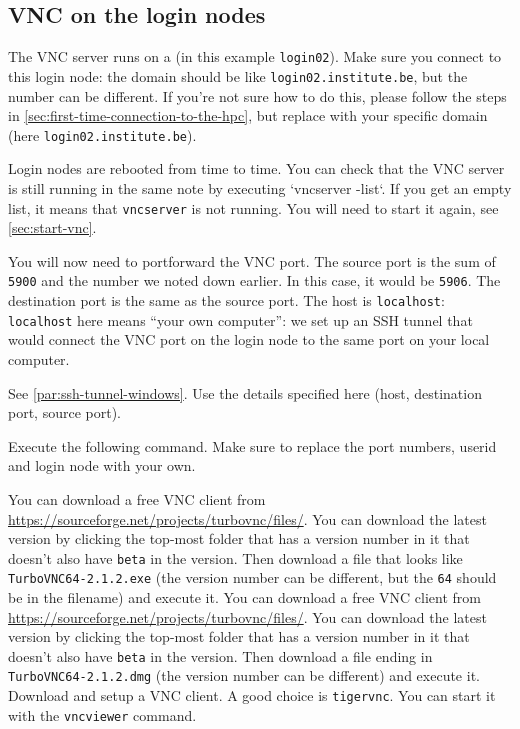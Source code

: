 \subsection{VNC on the login nodes}

The VNC server runs on a  (in this example \lstinline|login02|).
Make sure you connect to this login node: the domain should be like \lstinline|login02.institute.be|,
but the number can be different. If you're not sure how to do this, please follow the steps
in \autoref{sec:first-time-connection-to-the-hpc}, but replace \loginnode with your specific
domain (here \lstinline|login02.institute.be|).

Login nodes are rebooted from time to time. You can check that the VNC server is still
running in the same note by executing `vncserver -list`. If you get an empty list,
it means that \lstinline|vncserver| is not running. You will need to start it again,
see \autoref{sec:start-vnc}.

You will now need to portforward the VNC port. The source port is the sum of \lstinline|5900|
and the number we noted down earlier. In this case, it would be \lstinline|5906|.
The destination port is the same as the source port. The host is \lstinline|localhost|:
\lstinline|localhost| here means ``your own computer'': we set up an SSH tunnel that would
connect the VNC port on the login node to the same port on your local computer.

\ifwindows
See \autoref{par:ssh-tunnel-windows}. Use the details specified here (host, destination port,
source port).
\else

Execute the following command. Make sure to replace the port numbers, userid and login node
with your own.

\begin{prompt}
\end{prompt}
\fi

\ifwindows

You can download a free VNC client from \url{https://sourceforge.net/projects/turbovnc/files/}.
You can download the latest version by clicking the top-most folder that has a version number
in it that doesn't also have \lstinline|beta| in the version. Then download a file that looks like
\lstinline|TurboVNC64-2.1.2.exe| (the version number can be different, but the \lstinline|64|
should be in the filename) and execute it.
\fi
\ifmac
You can download a free VNC client from \url{https://sourceforge.net/projects/turbovnc/files/}.
You can download the latest version by clicking the top-most folder that has a version number
in it that doesn't also have \lstinline|beta| in the version. Then download a file ending in
\lstinline|TurboVNC64-2.1.2.dmg| (the version number can be different) and execute it.
\fi
\iflinux
Download and setup a VNC client. A good choice is \lstinline|tigervnc|. You can start
it with the \lstinline|vncviewer| command.
\fi

